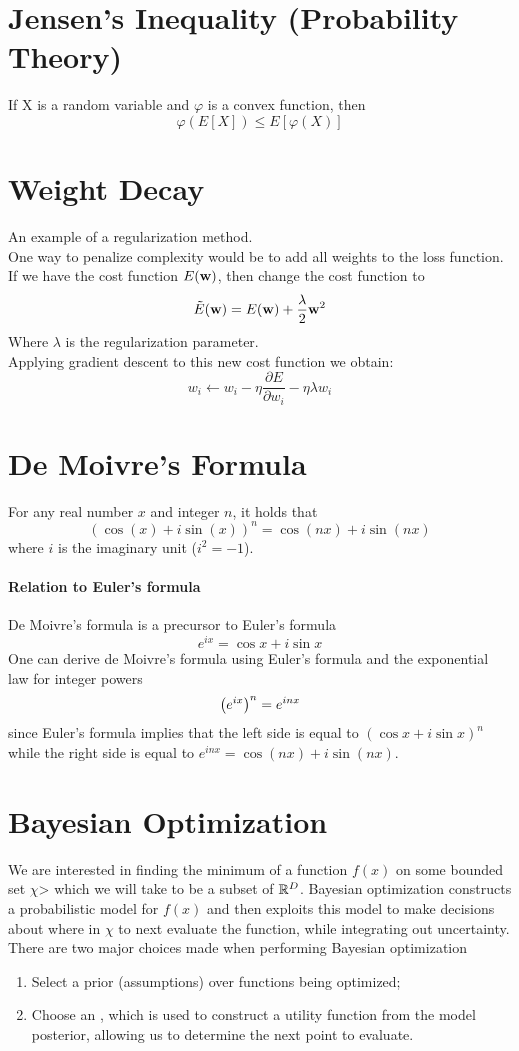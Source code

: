 \documentclass[11pt]{article}
\begin{document}
\section{Jensen's Inequality (Probability Theory)}
If X is a random variable and $\varphi$ is a convex function, then
$$\varphi(E[X]) \leq E[\varphi(X)]$$

\section{Weight Decay}
An example of a regularization method. \\
One way to penalize complexity would be to add all weights to the loss function. \\
If we have the cost function $E(\textbf{w})$, then change the cost function to
$$\tilde{E}(\textbf{w}) = E(\textbf{w}) + \frac{\lambda}{2} \textbf{w}^2$$
Where $\lambda$ is the regularization parameter.\\
Applying gradient descent to this new cost function we obtain:
$$w_i \leftarrow w_i - \eta \frac{\partial E}{\partial w_i} - \eta\lambda w_i$$
\section{De Moivre's Formula}
For any real number $x$ and integer $n$, it holds that
$$(\cos (x) + i\sin(x))^n = \cos (nx) + i\sin(nx)$$
where $i$ is the imaginary unit ($i^2 = -1$).
\paragraph{Relation to Euler's formula}
De Moivre's formula is a precursor to Euler's formula
$$e^{ix} = \cos x + i \sin x$$
One can derive de Moivre's formula using Euler's formula and the exponential law for integer powers $${\left(e^{i x}\right)^{n}=e^{i n x}} \\ $$
since Euler's formula implies that the left side is equal to $(\cos x+i \sin x)^{n}$ while the right side is equal to  $e^{i n x}=\cos (n x)+i \sin (n x)$.


\section{Bayesian Optimization}
We are interested in finding the minimum of a function $f(x)$ on some bounded set $\chi$> which we will take to be a subset of $\mathbb{R}^D$. Bayesian optimization constructs a probabilistic model for $f(x)$ and then exploits this model to make decisions about where in $\chi$ to next evaluate the function, while integrating out uncertainty. \\
There are two major choices made when performing Bayesian optimization
\begin{enumerate}
	\item Select a prior (assumptions) over functions being optimized;
	\item Choose an , which is used to construct a utility function from the model posterior, allowing us to determine the next point to evaluate.
\end{enumerate}
\end{document}
